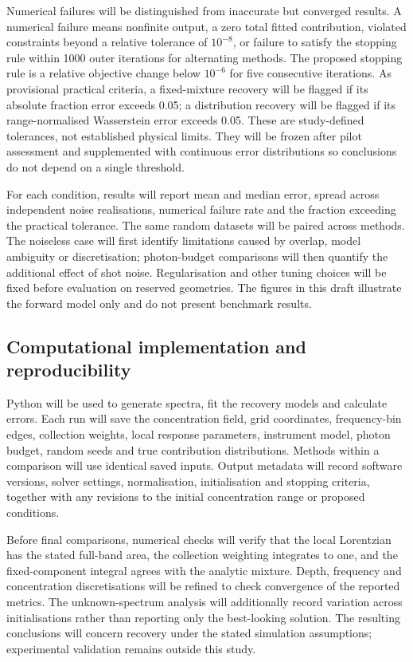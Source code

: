 \documentclass[11pt]{article}
\begin{document}
Numerical failures will be distinguished from inaccurate but converged results. A numerical failure means nonfinite output, a zero total fitted contribution, violated constraints beyond a relative tolerance of $10^{-8}$, or failure to satisfy the stopping rule within 1000 outer iterations for alternating methods. The proposed stopping rule is a relative objective change below $10^{-6}$ for five consecutive iterations. As provisional practical criteria, a fixed-mixture recovery will be flagged if its absolute fraction error exceeds 0.05; a distribution recovery will be flagged if its range-normalised Wasserstein error exceeds 0.05. These are study-defined tolerances, not established physical limits. They will be frozen after pilot assessment and supplemented with continuous error distributions so conclusions do not depend on a single threshold.

For each condition, results will report mean and median error, spread across independent noise realisations, numerical failure rate and the fraction exceeding the practical tolerance. The same random datasets will be paired across methods. The noiseless case will first identify limitations caused by overlap, model ambiguity or discretisation; photon-budget comparisons will then quantify the additional effect of shot noise. Regularisation and other tuning choices will be fixed before evaluation on reserved geometries. The figures in this draft illustrate the forward model only and do not present benchmark results.

\subsection{Computational implementation and reproducibility}

Python will be used to generate spectra, fit the recovery models and calculate errors. Each run will save the concentration field, grid coordinates, frequency-bin edges, collection weights, local response parameters, instrument model, photon budget, random seeds and true contribution distributions. Methods within a comparison will use identical saved inputs. Output metadata will record software versions, solver settings, normalisation, initialisation and stopping criteria, together with any revisions to the initial concentration range or proposed conditions.

Before final comparisons, numerical checks will verify that the local Lorentzian has the stated full-band area, the collection weighting integrates to one, and the fixed-component integral agrees with the analytic mixture. Depth, frequency and concentration discretisations will be refined to check convergence of the reported metrics. The unknown-spectrum analysis will additionally record variation across initialisations rather than reporting only the best-looking solution. The resulting conclusions will concern recovery under the stated simulation assumptions; experimental validation remains outside this study.

\clearpage
\end{document}
